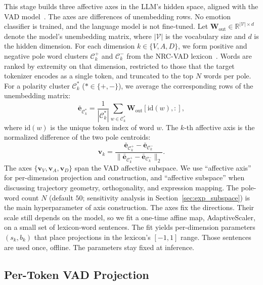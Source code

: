 \documentclass[letterpaper, 10 pt, conference]{ieeeconf/ieeeconf}
\begin{document}
This stage builds three affective axes in the LLM's hidden space, aligned with the VAD model~\cite{russell1977evidence}. The axes are differences of unembedding rows. No emotion classifier is trained, and the language model is not fine-tuned.
Let $\mathbf{W}_{\mathrm{out}} \in \mathbb{R}^{|\mathcal{V}| \times d}$ denote the model's unembedding matrix, where $|\mathcal{V}|$ is the vocabulary size and $d$ is the hidden dimension.
For each dimension $k \in \{V, A, D\}$, we form positive and negative pole word clusters $\mathcal{C}^{+}_k$ and $\mathcal{C}^{-}_k$ from the NRC-VAD lexicon~\cite{mohammad2018nrcvad}. Words are ranked by extremity on that dimension, restricted to those that the target tokenizer encodes as a single token, and truncated to the top $N$ words per pole.
For a polarity cluster $\mathcal{C}^{*}_k$ ($* \in \{+, -\}$), we average the corresponding rows of the unembedding matrix:
\begin{equation}
    \bar{\mathbf{e}}_{\mathcal{C}^{*}_k} = \frac{1}{|\mathcal{C}^{*}_k|}\sum_{w \in \mathcal{C}^{*}_k} \mathbf{W}_{\mathrm{out}}[\mathrm{id}(w), :],
\end{equation}
where $\mathrm{id}(w)$ is the unique token index of word $w$.
The $k$-th affective axis is the normalized difference of the two pole centroids:
\begin{equation}
    \mathbf{v}_k = \frac{\bar{\mathbf{e}}_{\mathcal{C}^{+}_k} - \bar{\mathbf{e}}_{\mathcal{C}^{-}_k}}{\bigl\|\bar{\mathbf{e}}_{\mathcal{C}^{+}_k} - \bar{\mathbf{e}}_{\mathcal{C}^{-}_k}\bigr\|_2}.
    \label{eq:valence_axis}
\end{equation}
The axes $\{\mathbf{v}_V, \mathbf{v}_A, \mathbf{v}_D\}$ span the VAD affective subspace. We use ``affective axis'' for per-dimension projection and construction, and ``affective subspace'' when discussing trajectory geometry, orthogonality, and expression mapping.
The pole-word count $N$ (default $50$; sensitivity analysis in Section~\ref{sec:exp_subspace}) is the main hyperparameter of axis construction.
The axes fix the directions. Their scale still depends on the model, so we fit a one-time affine map, AdaptiveScaler, on a small set of lexicon-word sentences. The fit yields per-dimension parameters $(s_k, b_k)$ that place projections in the lexicon's $[-1, 1]$ range. Those sentences are used once, offline. The parameters stay fixed at inference.

\subsection{Per-Token VAD Projection}
\label{sec:projection}
\end{document}
